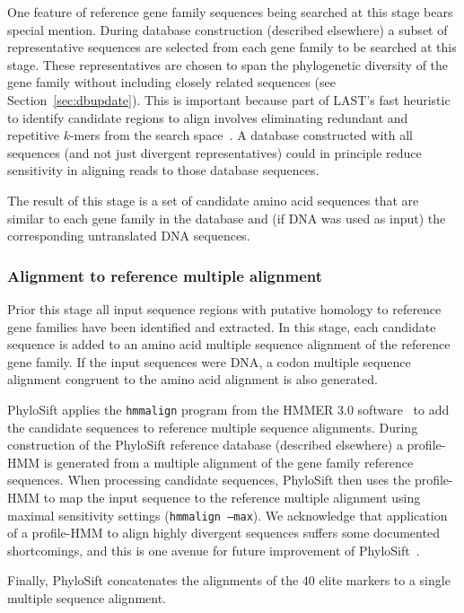 \documentclass[10pt]{article}
\begin{document}
One feature of reference gene family sequences being searched at this stage bears special mention.
During database construction (described elsewhere) a subset of representative sequences are selected from each gene family to be searched at this stage.
These representatives are chosen to span the phylogenetic diversity of the gene family without including closely related sequences (see Section~\ref{sec:dbupdate}).
This is important because part of LAST's fast heuristic to identify candidate regions to align involves eliminating redundant and repetitive $k$-mers from the search space~\cite{Kiełbasa2011}.
A database constructed with all sequences (and not just divergent representatives) could in principle reduce sensitivity in aligning reads to those database sequences.

The result of this stage is a set of candidate amino acid sequences that are similar to each gene family in the database and (if DNA was used as input) the corresponding untranslated DNA sequences.

\subsubsection*{Alignment to reference multiple alignment}
Prior this stage all input sequence regions with putative homology to reference gene families have been identified and extracted.
In this stage, each candidate sequence is added to an amino acid multiple sequence alignment of the reference gene family.
If the input sequences were {DNA}, a codon multiple sequence alignment congruent to the amino acid alignment is also generated.

PhyloSift applies the \texttt{hmmalign} program from the HMMER 3.0 software~\cite{hmmer3} to add the candidate sequences to reference multiple sequence alignments.
During construction of the PhyloSift reference database (described elsewhere) a profile-HMM is generated from a multiple alignment of the gene family reference sequences.
When processing candidate sequences, PhyloSift then uses the profile-HMM to map the input sequence to the reference multiple alignment using maximal sensitivity settings (\texttt{hmmalign --max}).
We acknowledge that application of a profile-HMM to align highly divergent sequences suffers some documented shortcomings, and this is one avenue for future improvement of PhyloSift~\cite{Loytynoja2012}.

Finally, PhyloSift concatenates the alignments of the 40 elite markers to a single multiple sequence alignment.
\end{document}
